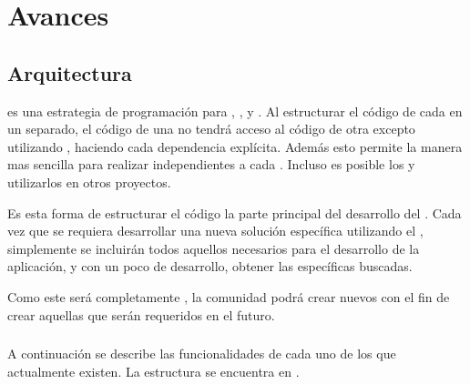 
\chapter{Avances}

\section{Arquitectura}

\packagesAS es una estrategia de programación para \codeSeparationQA, \modularityAS, y \reusabilityQA. Al estructurar el código de cada \featureCPT en un \packagesAS separado, el código de una \featureCPT no tendrá acceso al código de otra \featureCPT excepto utilizando \exportCPT, haciendo cada dependencia explícita. Además esto permite la manera mas sencilla para realizar \testingCPT independientes a cada \featureCPT. Incluso es posible \publishINT los \packagesAS y utilizarlos en otros proyectos.

Es esta forma de estructurar el código la parte principal del desarrollo del \frameworkPC \ecommerceCOM. Cada vez que se requiera desarrollar una nueva solución específica utilizando el \frameworkPC, simplemente se incluirán todos aquellos \modulesAS necesarios para el desarrollo de la aplicación, y con un poco de desarrollo, obtener las \featuresCPT específicas buscadas.

Como este \frameworkPC será completamente \openSourcePC, la comunidad podrá crear nuevos \modulesAS con el fin de crear aquellas \featuresCPT que serán requeridos en el futuro.



\subsection{\packagesAS}

A continuación se describe las funcionalidades de cada uno de los \packagesAS que actualmente existen. La estructura se encuentra en .

